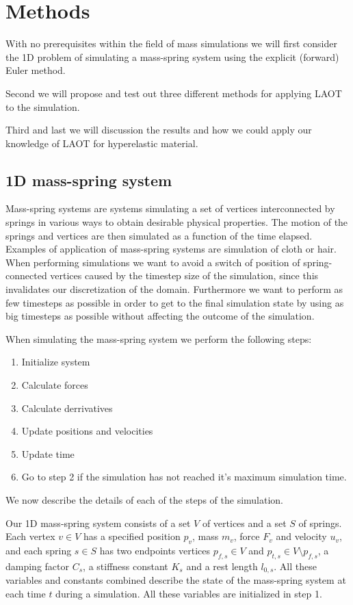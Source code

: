 \documentclass[11pt]{article}
\begin{document}

\section{Methods}
\label{sec:methods}

With no prerequisites within the field of mass simulations we will first
consider the 1D problem of simulating a mass-spring system using the explicit
(forward) Euler method.

Second we will propose and test out three different methods for applying LAOT
to the simulation.

Third and last we will discussion the results and how we could apply our
knowledge of LAOT for hyperelastic material.

\subsection{1D mass-spring system} Mass-spring systems are systems simulating
a set of vertices interconnected by springs in various ways to obtain
desirable physical properties. The motion of the springs and vertices are
then simulated as a function of the time elapsed. Examples of application of
mass-spring systems are simulation of cloth or hair. When performing simulations
we want to avoid a switch of position of spring-connected vertices caused by the
timestep size of the simulation, since this invalidates our discretization of
the domain. Furthermore we want to perform as few timesteps as possible in order
to get to the final simulation state by using as big timesteps as possible
without affecting the outcome of the simulation.

When simulating the mass-spring system we perform the following steps:
\begin{enumerate} \item Initialize system \item Calculate forces \item
Calculate derrivatives \item Update positions and velocities \item Update time
\item Go to step 2 if the simulation has not reached it's maximum simulation
time. \end{enumerate} We now describe the details of each of the steps of
the simulation.

Our 1D mass-spring system consists of a set $V$ of vertices and a set
$S$ of springs. Each vertex $v \in V$ has a specified position $p_v$,
mass $m_v$, force $F_v$ and velocity $u_v$, and each spring $s \in S$
has two endpoints vertices $p_{f,s} \in V$ and $p_{t,s} \in V \setminus
p_{f,s}$, a damping factor $C_s$, a stiffness constant $K_s$ and a rest length
$l_{0,s}$. All these variables and constants combined describe the state
of the mass-spring system at each time $t$ during a simulation. All these
variables are initialized in step 1.
\end{document}

